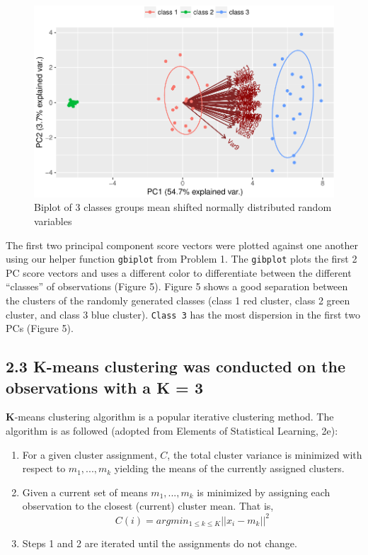 \documentclass[]{article}
\begin{document}
\begin{figure}[htbp]
\centering
\includegraphics{sta546_hw2_files/figure-latex/unnamed-chunk-9-1.pdf}
\caption{Biplot of 3 classes groups mean shifted normally distributed
random variables}
\end{figure}

The first two principal component score vectors were plotted against one
another using our helper function \texttt{gbiplot} from Problem 1. The
\texttt{gibplot} plots the first 2 PC score vectors and uses a different
color to differentiate between the different ``classes'' of observations
(Figure 5). Figure 5 shows a good separation between the clusters of the
randomly generated classes (class 1 red cluster, class 2 green cluster,
and class 3 blue cluster). \texttt{Class 3} has the most dispersion in
the first two PCs (Figure 5).

\subsection{2.3 \textbf{K}-means clustering was conducted on the
observations with a \textbf{K} =
3}\label{k-means-clustering-was-conducted-on-the-observations-with-a-k-3}

\textbf{K}-means clustering algorithm is a popular iterative clustering
method. The algorithm is as followed (adopted from Elements of
Statistical Learning, 2e):

\begin{enumerate}
\def\labelenumi{\arabic{enumi}.}
\itemsep1pt\parskip0pt
\item
  For a given cluster assignment, \(C\), the total cluster variance is
  minimized with respect to \({m_{1},...,m_{k}}\) yielding the means of
  the currently assigned clusters.
\item
  Given a current set of means \({m_{1},...,m_{k}}\) is minimized by
  assigning each observation to the closest (current) cluster mean. That
  is,
  \[C(i) = argmin_{1 \leq k \leq K} \big|\big| x_{i} - m_{k} \big|\big|^2\]
\item
  Steps 1 and 2 are iterated until the assignments do not change.
\end{enumerate}
\end{document}
